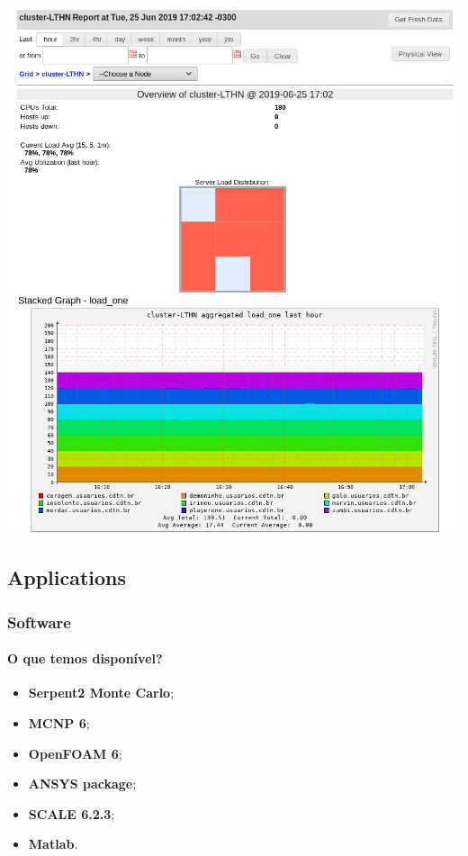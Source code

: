 \documentclass[svgnames,smaller,table]{beamer}
\begin{document}
\begin{frame}
  \centering\includegraphics[scale=0.32]{images/ganglia_colors.png}
 
\end{frame}


\subsection{Applications}
\begin{frame}
  \frametitle{Software}
  \framesubtitle{O que temos disponível?}
  \begin{itemize}
  \item \textbf{Serpent2 Monte Carlo};
  \item \textbf{MCNP 6};
  \item \textbf{OpenFOAM 6};
  \item \textbf{ANSYS package};
  \item \textbf{SCALE 6.2.3};
  \item \textbf{Matlab}.
  \end{itemize}
\end{frame}
\end{document}
